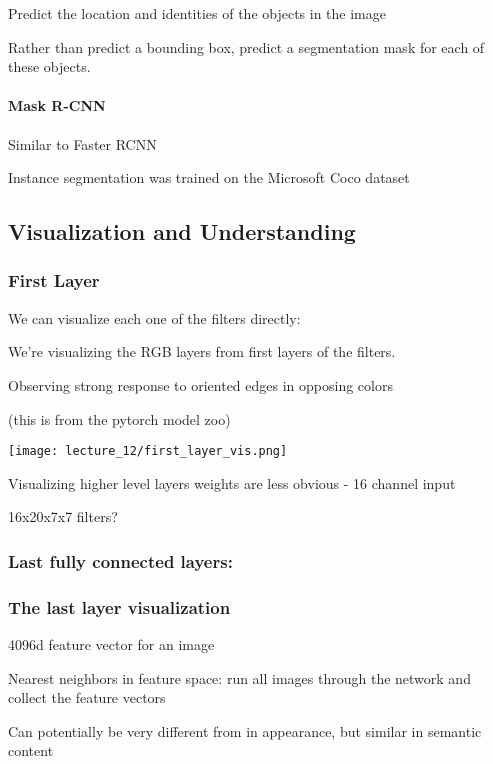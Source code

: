 Predict the location and identities of the objects in the image

Rather than predict a bounding box, predict a segmentation mask for each of these objects.

\paragraph{Mask R-CNN }

Similar to Faster RCNN

Instance segmentation was trained on the Microsoft Coco dataset

\subsection{Visualization and Understanding}

\subsubsection{First Layer}

We can visualize each one of the filters directly:

We're visualizing the RGB layers from first layers of the filters. 

Observing  strong response to oriented edges in opposing colors

(this is from the pytorch model zoo)

\texttt{[image: lecture\_12/first\_layer\_vis.png]}

Visualizing higher level layers weights are less obvious - 16 channel input

16x20x7x7 filters?

\subsubsection{Last fully connected layers:}

\subsubsection{The last layer visualization}

4096d feature vector for an image

Nearest neighbors in feature space:  run all images through the network and collect the feature vectors

Can potentially be very different from in appearance, but similar in semantic content

